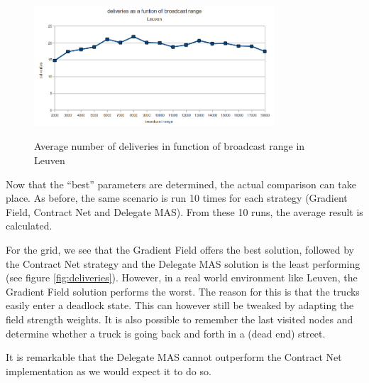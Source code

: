 \begin{figure}[H]
	\begin{center}
		\includegraphics[width=0.8\textwidth]{./figs/leuven_broadcastRangeExperiment.png}
		\label{fig:leuven_broadcast}
		\caption{Average number of deliveries in function of broadcast range in
		Leuven}
	\end{center}
\end{figure}

\npar Now that the ``best'' parameters are determined, the actual comparison can
take place. As before, the same scenario is run 10 times for each strategy
(Gradient Field, Contract Net and Delegate MAS). From these 10 runs, the average
result is calculated. 

\npar For the grid, we see that the Gradient Field offers the best solution,
followed by the Contract Net strategy and the Delegate MAS solution is the least
performing (see figure \ref{fig:deliveries}). However, in a real world
environment like Leuven, the Gradient Field solution performs the worst. The
reason for this is that the trucks easily enter a deadlock state. This can
however still be tweaked by adapting the field strength weights. It is also
possible to remember the last visited nodes and determine whether a truck is
going back and forth in a (dead end) street.

\npar It is remarkable that the Delegate MAS cannot outperform the Contract Net
implementation as we would expect it to do so.

